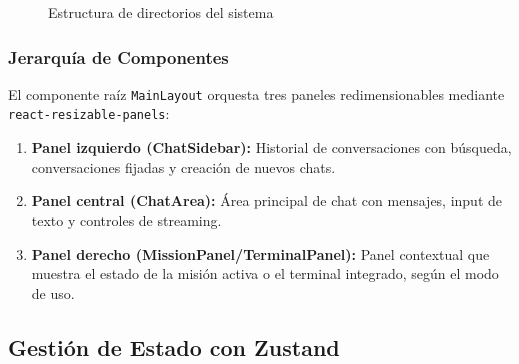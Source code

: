 \begin{figure}[H]
    \centering
    \renewcommand*\DTstylecomment{\rmfamily\color{gray}\textsc}
    \begin{minipage}{0.9\textwidth} %
    \end{minipage}
    \caption{Estructura de directorios del sistema}
    \label{fig:directorios}
\end{figure}

\subsubsection{Jerarquía de Componentes}

El componente raíz \texttt{MainLayout} orquesta tres paneles redimensionables mediante \texttt{react-resizable-panels}:

\begin{enumerate}
    \item \textbf{Panel izquierdo (ChatSidebar):} Historial de conversaciones con búsqueda, conversaciones fijadas y creación de nuevos chats.
    \item \textbf{Panel central (ChatArea):} Área principal de chat con mensajes, input de texto y controles de streaming.
    \item \textbf{Panel derecho (MissionPanel/TerminalPanel):} Panel contextual que muestra el estado de la misión activa o el terminal integrado, según el modo de uso.
\end{enumerate}

\subsection{Gestión de Estado con Zustand}

